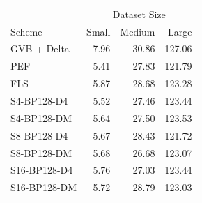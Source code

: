 \begin{tabular}{lrrr}
\toprule
 & \multicolumn{3}{c}{Dataset Size} \\
Scheme & Small & Medium & Large \\
\midrule
GVB + Delta & 7.96 & 30.86 & 127.06 \\
PEF & 5.41 & 27.83 & 121.79 \\
FLS & 5.87 & 28.68 & 123.28 \\
S4-BP128-D4 & 5.52 & 27.46 & 123.44 \\
S4-BP128-DM & 5.64 & 27.50 & 123.53 \\
S8-BP128-D4 & 5.67 & 28.43 & 121.72 \\
S8-BP128-DM & 5.68 & 26.68 & 123.07 \\
S16-BP128-D4 & 5.76 & 27.03 & 123.44 \\
S16-BP128-DM & 5.72 & 28.79 & 123.03 \\
\bottomrule
\end{tabular}
